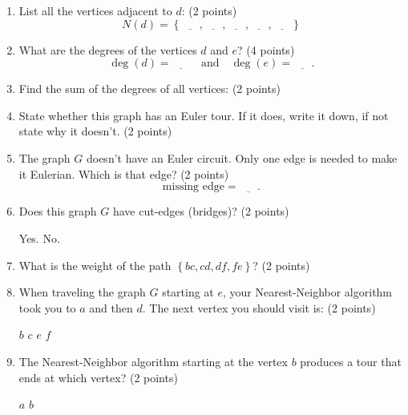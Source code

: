 \documentclass[12pt]{exam}
\begin{document}
\begin{enumerate}
\begin{enumerate}
\begin{figure}[h!]
\begin{tikzpicture}[x=0.75pt,y=0.75pt,yscale=-1,xscale=1]
    
    \end{tikzpicture}
\end{figure}
\vfill
\item List all the vertices adjacent to $d$: (2 points)
$$N(d)=\left\lbrace\underline{\phantom{ans}},\underline{\phantom{ans}},\underline{\phantom{ans}},\underline{\phantom{ans}},\underline{\phantom{ans}}\right\rbrace$$

\vfill
\item What are the degrees of the vertices $d$ and $e$? (4 points)
$$\deg(d)=\underline{\phantom{ans}}\quad\text{and}\quad\deg(e)=\underline{\phantom{ans}}.$$
\vfill
\item Find the sum of the degrees of all vertices: (2 points)
\begin{checkboxes}
\end{checkboxes}
\vfill
\item State whether this graph has an Euler tour. If it does, write it down, if not state why it doesn't. (2 points)
    \vspace{7em}
\vfill
\item The graph $G$ doesn't have an Euler circuit. Only one edge is needed to make it Eulerian. Which is that edge? (2 points)
  $$\text{missing edge}=\underline{\phantom{ans}}.$$
\vfill
\item Does this graph $G$ have cut-edges (bridges)? (2 points)
    \begin{checkboxes}
        \choice Yes.
        \choice No.
    \end{checkboxes}
    \vfill
\item What is the weight of the path $\left\lbrace bc,cd,df,fe\right\rbrace$? (2 points)
\begin{checkboxes}
\end{checkboxes}
\vfill
\item When traveling the graph $G$ starting at $e$, your Nearest-Neighbor algorithm took you to $a$ and then $d$. The next vertex you should visit is: (2 points)
\begin{checkboxes}
    \choice $b$
    \choice $c$
    \choice $e$
    \choice $f$
\end{checkboxes}
\vfill
\item The Nearest-Neighbor algorithm starting at the vertex $b$ produces a tour that ends at which vertex? (2 points)
\begin{checkboxes}
    \choice $a$
    \choice $b$

\end{checkboxes}
\end{enumerate}
\end{enumerate}
\end{document}
